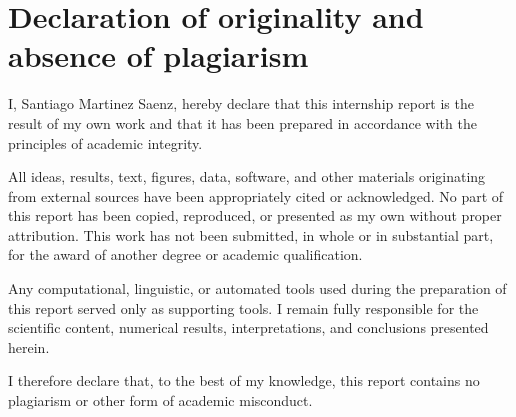 
\chapter{Declaration of originality and absence of plagiarism}
\label{sec:declaration_of_originality_declaration_of_originality_and_absence_of_plagiarism}

I, Santiago Martinez Saenz, hereby declare that this internship report is the result of my own work and that it has been prepared in accordance with the principles of academic integrity.

All ideas, results, text, figures, data, software, and other materials originating from external sources have been appropriately cited or acknowledged. No part of this report has been copied, reproduced, or presented as my own without proper attribution. This work has not been submitted, in whole or in substantial part, for the award of another degree or academic qualification.

Any computational, linguistic, or automated tools used during the preparation of this report served only as supporting tools. I remain fully responsible for the scientific content, numerical results, interpretations, and conclusions presented herein.

I therefore declare that, to the best of my knowledge, this report contains no plagiarism or other form of academic misconduct.

